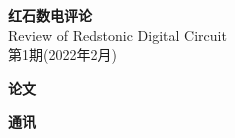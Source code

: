 \documentclass[UTF8,12pt,punct=kaiming,fontset=none]{ctexart}
\begin{document}
\thispagestyle{empty}
\BgThispage
\quad
\newpage

\quad
\vspace{-0.3cm}
\begin{center}
    \fontsize{46pt}{54.2pt} \textbf{红石数电评论} \\
    \Large Review of Redstonic Digital Circuit \\
    \Large 第1期(2022年2月)
\end{center}

\makeatletter
\newcommand{\cdotfill}{\leavevmode\cleaders\hb@xt@ 0.56cm{\hss\ensuremath{\cdots}\hss }\hfill\kern\z@}
\makeatother
{}
\setcounter{currentPageNumber}{3}
\newcommand{\addContent}{
    \setcounter{nextPageNumber}{\arabic{currentPageNumber}}
    \ifthenelse{\pageNumber>1}{
        \addtocounter{nextPageNumber}{\pageNumber}
        \addtocounter{nextPageNumber}{-1}
        \fileName\cdotfill\authorName\quad\arabic{currentPageNumber} - \arabic{nextPageNumber}
    }{
        \fileName\cdotfill\authorName\quad\arabic{currentPageNumber}
    }
    \addtocounter{currentPageNumber}{\pageNumber}

}

\begin{spacing}{1.8}

\large\sffamily\bfseries 论文

\normalsize\normalfont


\large\sffamily\bfseries 通讯

\normalsize\normalfont


\end{spacing}

\vspace{0.5cm}
\end{document}
